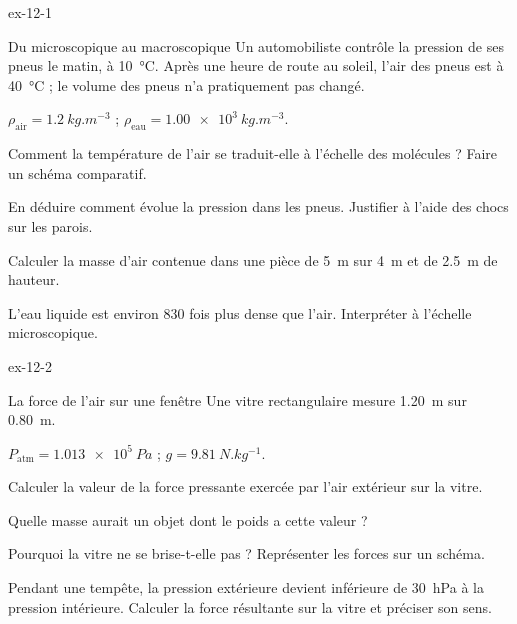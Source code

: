 \begin{blocLivre}{ex-12-1}
\begin{exercice}[1]{Du microscopique au macroscopique}
Un automobiliste contrôle la pression de ses pneus le matin, à \qty{10}{\degreeCelsius}. Après une heure de route au soleil, l'air des pneus est à
\qty{40}{\degreeCelsius} ; le volume des pneus n'a pratiquement pas changé.
\begin{donnees}
$\rho_\mathrm{air}=\qty{1,2}{kg.m^{-3}}$ ; $\rho_\mathrm{eau}=\qty{1,00e3}{kg.m^{-3}}$.
\end{donnees}
\begin{questions}
\item Comment la température de l'air se traduit-elle à l'échelle des molécules ? Faire un schéma comparatif.
\item En déduire comment évolue la pression dans les pneus. Justifier à l'aide des chocs sur les parois.
\item Calculer la masse d'air contenue dans une pièce de \qty{5}{m} sur \qty{4}{m} et de \qty{2,5}{m} de hauteur.
\item L'eau liquide est environ 830 fois plus dense que l'air. Interpréter à l'échelle microscopique.
\end{questions}
\end{exercice}
\end{blocLivre}
\begin{blocLivre}{ex-12-2}
\begin{exercice}[1]{La force de l'air sur une fenêtre}
Une vitre rectangulaire mesure \qty{1,20}{m} sur \qty{0,80}{m}.
\begin{donnees}
$P_\mathrm{atm}=\qty{1,013e5}{Pa}$ ; $g=\qty{9,81}{N.kg^{-1}}$.
\end{donnees}
\begin{questions}
\item Calculer la valeur de la force pressante exercée par l'air extérieur sur la vitre.
\item Quelle masse aurait un objet dont le poids a cette valeur ?
\item Pourquoi la vitre ne se brise-t-elle pas ? Représenter les forces sur un schéma.
\item Pendant une tempête, la pression extérieure devient inférieure de \qty{30}{hPa} à la pression intérieure. Calculer la force
résultante sur la vitre et préciser son sens.
\end{questions}
\end{exercice}
\end{blocLivre}
